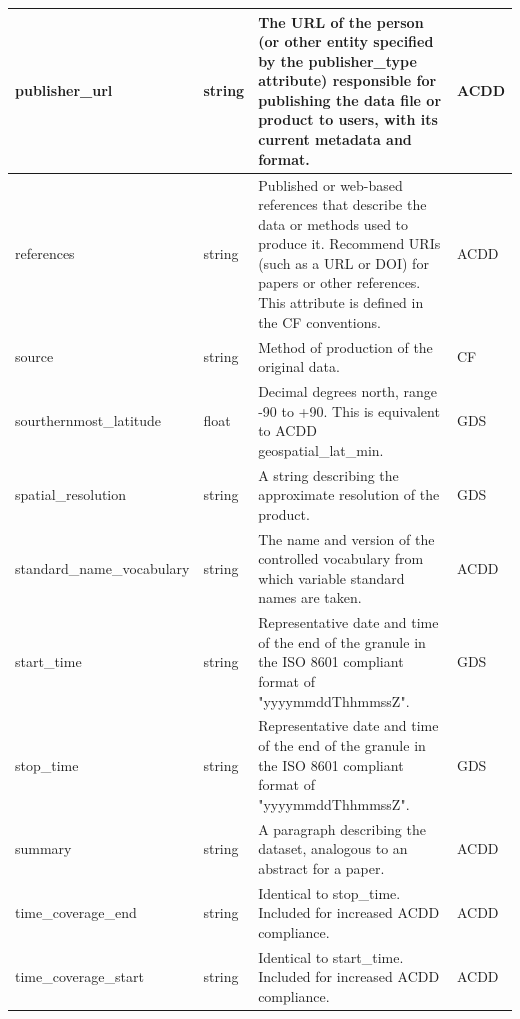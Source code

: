 \begin{longtable}{|p{}|p{}|p{}|p{}|}
\rowcolor{LightCyan} publisher\_url & string & The URL of the person (or other entity specified by the publisher\_type attribute) responsible for publishing the data file or product to users, with its current metadata and format. & ACDD \\ \hline

\rowcolor{LightCyan} references & string & Published or web-based references that describe the data or methods used to produce it. Recommend URIs (such as a URL or DOI) for papers or other references. This attribute is defined in the CF conventions. & ACDD \\ \hline

\rowcolor{LightCyan} source & string & Method of production of the original data. & CF \\ \hline

\rowcolor{LightCyan} sourthernmost\_latitude & float & Decimal degrees north, range -90 to +90. This is equivalent to ACDD geospatial\_lat\_min. & GDS \\ \hline

\rowcolor{LightCyan} spatial\_resolution & string & A string describing the approximate resolution of the product. & GDS \\ \hline

\rowcolor{LightCyan} standard\_name\_vocabulary & string & The name and version of the controlled vocabulary from which variable standard names are taken. & ACDD \\ \hline

\rowcolor{LightCyan} start\_time & string & Representative date and time of the end of the granule in the ISO 8601 compliant format of "yyyymmddThhmmssZ". & GDS \\ \hline

\rowcolor{LightCyan} stop\_time & string & Representative date and time of the end of the granule in the ISO 8601 compliant format of "yyyymmddThhmmssZ". & GDS \\ \hline

\rowcolor{LightCyan} summary & string & A paragraph describing the dataset, analogous to an abstract for a paper. & ACDD \\ \hline

\rowcolor{LightCyan} time\_coverage\_end & string & Identical to stop\_time. Included for increased ACDD compliance. & ACDD \\ \hline

\rowcolor{LightCyan} time\_coverage\_start & string & Identical to start\_time. Included for increased ACDD compliance. & ACDD \\ \hline


\end{longtable}
